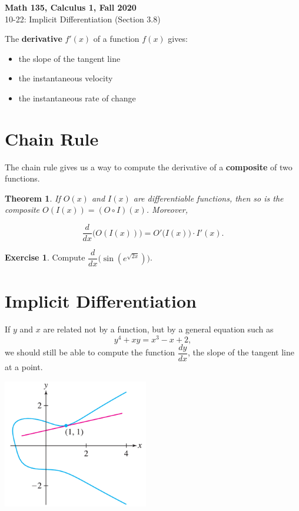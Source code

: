 \documentclass[11pt,reqno,final]{amsart}
\numberwithin{figure}{section}
\newtheorem*{theorem*}{Theorem}%
\theoremstyle{definition} %
\newtheorem{exercise}[question]{Exercise}
\begin{document}
\begin{center}
        \textbf{\Large Math 135, Calculus 1, Fall 2020}\\[10pt]
        {\large 10-22: Implicit Differentiation (Section 3.8)}
\end{center}

\thispagestyle{empty}


\renewcommand{\thesection}{\Alph{section}}


The \textbf{derivative} $f'(x)$ of a function $f(x)$ gives:
\begin{itemize}
\item the slope of the tangent line
\item the instantaneous velocity
\item the instantaneous rate of change
\end{itemize}


\section{Chain Rule}

The chain rule gives us a way to compute the derivative of a \textbf{composite} of two functions.
\begin{theorem*}
        If $O(x)$ and $I(x)$ are differentiable functions, then so is the composite $O(I(x)) = (O \circ I)(x)$.
        Moreover,
        \begin{framed}
                \[
                        \dfrac{d}{dx}\Big( O(I(x)) \Big) = O'\big( I(x) \big) \cdot I'(x).
                \]
        \end{framed}
\end{theorem*}

\begin{exercise}
        Compute $\dfrac{d}{dx} \Big( \sin\left(e^{\sqrt{2x}}\right) \Big)$.
        \vfill
\end{exercise}

\section{Implicit Differentiation}

If $y$ and $x$ are related not by a function, but by a general equation such as
\[
        y^4+xy = x^3 - x + 2,
\]
we should still be able to compute the function $\dfrac{dy}{dx}$, the slope of the tangent line at a point.
\begin{center}
        \includegraphics[width=2.5in]{10-23P_dydx.png}
\end{center}
\end{document}
